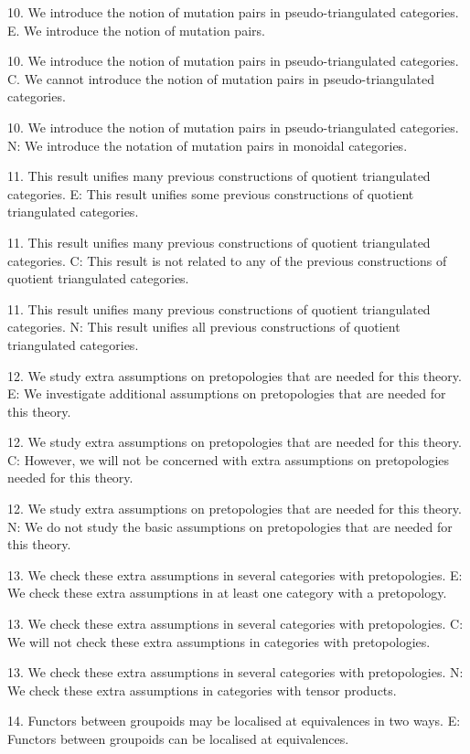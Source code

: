 10. We introduce the notion of mutation pairs in pseudo-triangulated categories.
E. We introduce the notion of mutation pairs.

10. We introduce the notion of mutation pairs in pseudo-triangulated categories.
C. We cannot introduce the notion of mutation pairs in pseudo-triangulated categories.

10. We introduce the notion of mutation pairs in pseudo-triangulated categories.
N: We introduce the notation of mutation pairs in monoidal categories.

11. This result unifies many previous constructions of quotient triangulated categories.
E: This result unifies some previous constructions of quotient triangulated categories.

11. This result unifies many previous constructions of quotient triangulated categories.
C: This result is not related to any of the previous constructions of quotient triangulated categories.

11. This result unifies many previous constructions of quotient triangulated categories.
N: This result unifies all previous constructions of quotient triangulated categories.

12. We study extra assumptions on pretopologies that are needed for this theory.
E: We investigate additional assumptions on pretopologies that are needed for this theory.

12. We study extra assumptions on pretopologies that are needed for this theory.
C: However, we will not be concerned with extra assumptions on pretopologies needed for this theory.

12. We study extra assumptions on pretopologies that are needed for this theory.
N: We do not study the basic assumptions on pretopologies that are needed for this theory.

13. We check these extra assumptions in several categories with pretopologies.
E: We check these extra assumptions in at least one category with a pretopology.

13. We check these extra assumptions in several categories with pretopologies.
C: We will not check these extra assumptions in categories with pretopologies.

13. We check these extra assumptions in several categories with pretopologies.
N: We check these extra assumptions in  categories with tensor products.


14. Functors between groupoids may be localised at equivalences in two ways.
E: Functors between groupoids can be localised at equivalences.

